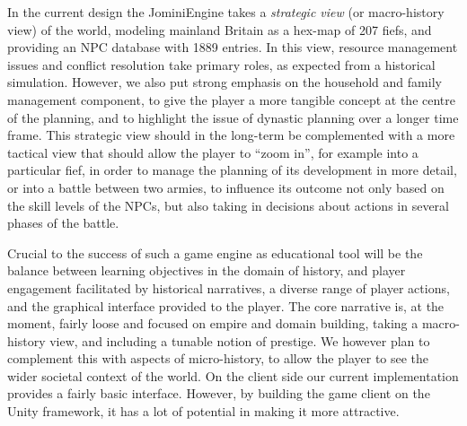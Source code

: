 \documentclass[11pt]{article}
\begin{document}
In the current design the JominiEngine takes a \emph{strategic view\/} (or macro-history view) of the world,
modeling mainland Britain as a hex-map of 207 fiefs, and providing an NPC
database with 1889 entries. In this view, resource management issues and
conflict resolution take primary roles, as expected from a historical simulation.
However, we also put strong emphasis on the household and family management
component, to give the player a more tangible concept at the centre of the planning,
and to highlight the issue of dynastic planning over a longer time frame.
%
%
This strategic view should in the long-term be complemented with a more
tactical view that should allow the player to ``zoom in'', for example
into a particular fief, in order to manage the planning of its development in
more detail, or into a battle between two armies, to influence its outcome
not only based on the skill levels of the NPCs, but also taking in decisions
about actions in several phases of the battle. 


Crucial to the success of such a game engine as educational tool will be the
balance between learning objectives in the domain of history, and player
engagement facilitated by historical narratives, a diverse range of player
actions, and the graphical interface provided to the player.
The core narrative is, at the moment, fairly loose and focused on empire and domain
building, taking a macro-history view, and including a tunable notion of prestige.
We however plan to complement this with aspects of micro-history, to allow the player
to see the wider societal context of the world.
On the client
side our current implementation provides a fairly basic interface. However,
by building the game client on the Unity framework, it has a lot of
potential in making it more attractive.
\end{document}
